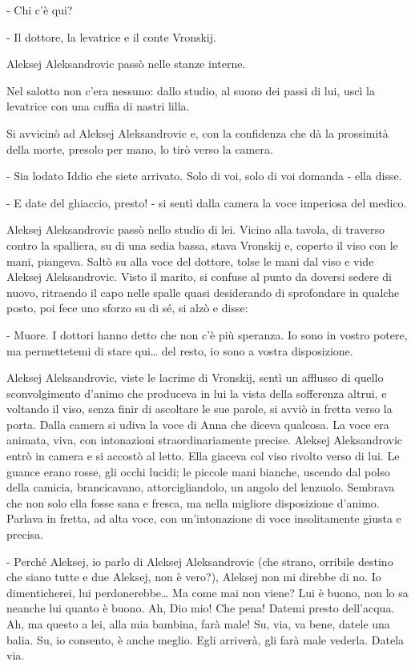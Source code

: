 - Chi c'è qui? 

- Il dottore, la levatrice e il conte Vronskij. 

Aleksej Aleksandrovic passò nelle stanze interne. 

Nel salotto non c'era nessuno: dallo studio, al suono dei passi di lui, uscì la levatrice con una cuffia di nastri lilla. 

Si avvicinò ad Aleksej Aleksandrovic e, con la confidenza che dà la prossimità della morte, presolo per mano, lo tirò verso la camera. 

- Sia lodato Iddio che siete arrivato. Solo di voi, solo di voi domanda - ella disse. 

- E date del ghiaccio, presto! - si sentì dalla camera la voce imperiosa del medico. 

Aleksej Aleksandrovic passò nello studio di lei. Vicino alla tavola, di traverso contro la spalliera, su di una sedia bassa, stava Vronskij e, coperto il viso con le mani, piangeva. Saltò su alla voce del dottore, tolse le mani dal viso e vide Aleksej Aleksandrovic. Visto il marito, si confuse al punto da doversi sedere di nuovo, ritraendo il capo nelle spalle quasi desiderando di sprofondare in qualche posto, poi fece uno sforzo su di sé, si alzò e disse: 

- Muore. I dottori hanno detto che non c'è più speranza. Io sono in vostro potere, ma permettetemi di stare qui\ldots{} del resto, io sono a vostra disposizione. 

Aleksej Aleksandrovic, viste le lacrime di Vronskij, sentì un afflusso di quello sconvolgimento d'animo che produceva in lui la vista della sofferenza altrui, e voltando il viso, senza finir di ascoltare le sue parole, si avviò in fretta verso la porta. Dalla camera si udiva la voce di Anna che diceva qualcosa. La voce era animata, viva, con intonazioni straordinariamente precise. Aleksej Aleksandrovic entrò in camera e si accostò al letto. Ella giaceva col viso rivolto verso di lui. Le guance erano rosse, gli occhi lucidi; le piccole mani bianche, uscendo dal polso della camicia, brancicavano, attorcigliandolo, un angolo del lenzuolo. Sembrava che non solo ella fosse sana e fresca, ma nella migliore disposizione d'animo. Parlava in fretta, ad alta voce, con un'intonazione di voce insolitamente giusta e precisa. 

- Perché Aleksej, io parlo di Aleksej Aleksandrovic (che strano, orribile destino che siano tutte e due Aleksej, non è vero?), Aleksej non mi direbbe di no. Io dimenticherei, lui perdonerebbe\ldots{} Ma come mai non viene? Lui è buono, non lo sa neanche lui quanto è buono. Ah, Dio mio! Che pena! Datemi presto dell'acqua. Ah, ma questo a lei, alla mia bambina, farà male! Su, via, va bene, datele una balia. Su, io consento, è anche meglio. Egli arriverà, gli farà male vederla. Datela via. 

